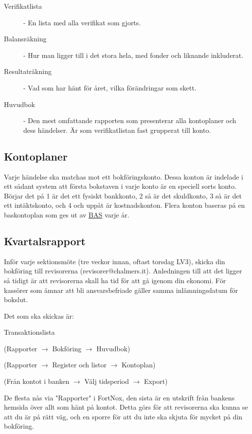 \documentclass{article}
\begin{document}
\begin{description}
    \item[Verifikatlista] - En lista med alla verifikat som gjorts. 
    \item[Balansräkning] - Hur man ligger till i det stora hela, med fonder och liknande inkluderat.
    \item[Resultaträkning] - Vad som har hänt för året, vilka förändringar som skett.
    \item[Huvudbok] - Den mest omfattande rapporten som presenterar alla kontoplaner och dess händelser. Är som verifikatlistan fast grupperat till konto.
\end{description}

\subsection*{Kontoplaner}
Varje händelse ska matchas mot ett bokföringskonto. Dessa konton är indelade i ett sådant system att första bokstaven i varje konto är en speciell sorts konto. Börjar det på 1 är det ett fysiskt bankkonto, 2 så är det skuldkonto, 3 så är det ett intäktskonto, och 4 och uppåt är kostnadskonton. Flera konton baseras på en baskontoplan som ges ut av \href{http://www.bas.se/}{BAS} varje år.  

\subsection*{Kvartalsrapport}
Inför varje sektionsmöte (tre veckor innan, oftast torsdag LV3), skicka din bokföring till revisorerna (revisorer@chalmers.it). Anledningen till att det ligger så tidigt är att revisorerna skall ha tid för att gå igenom din ekonomi.
För kassörer som ämnar att bli ansvarsbefriade gäller samma inlämningsdatum för bokslut.

Det som ska skickas är:
\begin{labeling}{Transaktionslista}
    \item [Huvudbok] \small{(Rapporter $\rightarrow$ Bokföring $\rightarrow$ Huvudbok)}
    \item [Kontoplan] \small{(Rapporter $\rightarrow$ Register och listor $\rightarrow$ Kontoplan)}
    \item [Transaktionslista] \small{(Från kontot i banken $\rightarrow$ Välj tidsperiod $\rightarrow$ Export)}
\end{labeling}

De flesta nås via "Rapporter" i FortNox, den sista är en utskrift från bankens hemsida över allt som hänt på kontot. Detta görs för att
revisorerna ska kunna se att du är på rätt väg, och en sporre för att du inte ska skjuta för mycket på din bokföring.
\end{document}
